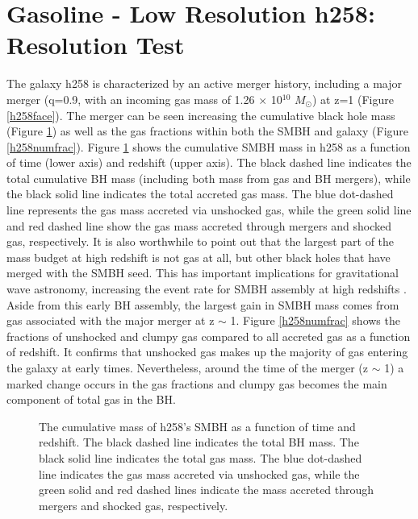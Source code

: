 \documentclass[12pt,headA,chapB]{fiskthesis}
\begin{document}
\section{Gasoline - Low Resolution h258: Resolution Test}
	
The galaxy h258 is characterized by an active merger history, including a major merger (q=0.9, with an incoming gas mass of 1.26 $\times$ 10$^10$ $M_{\odot}$) at z=1 (Figure \ref{h258face}). The merger can be seen increasing the cumulative black hole mass (Figure \ref{h258allmassgas}) as well as the gas fractions within both the SMBH and galaxy (Figure \ref{h258numfrac}). Figure \ref{h258allmassgas} shows the cumulative SMBH mass in h258 as a function of time (lower axis) and redshift (upper axis). The black dashed line indicates the total cumulative BH mass (including both mass from gas and BH mergers), while the black solid line indicates the total accreted gas mass. The blue dot-dashed line represents the gas mass accreted via unshocked gas, while the green solid line and red dashed line show the gas mass accreted through mergers and shocked gas, respectively. It is also worthwhile to point out that the largest part of the mass budget at high redshift is not gas at all, but other black holes that have merged with the SMBH seed. This has important implications for gravitational wave astronomy, increasing the event rate for SMBH assembly at high redshifts \citep{Holley-Bockelmann2010}. Aside from this early BH assembly, the largest gain in SMBH mass comes from gas associated with the major merger at z $\sim$ 1. Figure \ref{h258numfrac} shows the fractions of unshocked and clumpy gas compared to all accreted gas as a function of redshift. It confirms that unshocked gas makes up the majority of gas entering the galaxy at early times. Nevertheless, around the time of the merger (z $\sim$ 1) a marked change occurs in the gas fractions and clumpy gas becomes the main component of total gas in the BH.

\begin{figure}
\centerline{}
\caption[GASOLINE h258 SMBH Cumulative Mass]{The cumulative mass of h258's SMBH as a function of time and redshift. The black dashed line indicates the total BH mass. The black solid line indicates the total gas mass. The blue dot-dashed line indicates the gas mass accreted via unshocked gas, while the green solid and red dashed lines indicate the mass accreted through mergers and shocked gas, respectively.}
\label{h258allmassgas} 
\end{figure}
\end{document}
